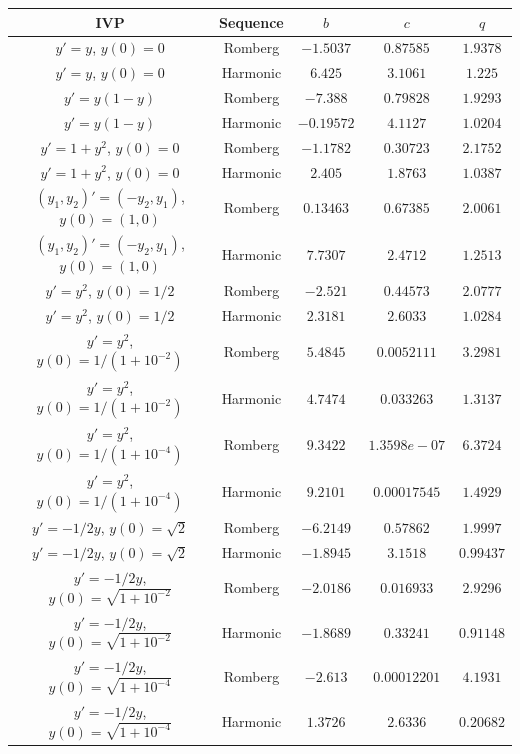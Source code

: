 \begin{table}[H]
    \centering
    \begin{tabular}{c|c||c|c|c}
           IVP & Sequence & \(b\) & \(c\) & \(q\) \\\hline\hline
$y'=y$, $y(0) = 0$ & Romberg & \(-1.5037\) & \(0.87585\) & \(1.9378\)\\
$y'=y$, $y(0) = 0$ & Harmonic & \(6.425\) & \(3.1061\) & \(1.225\)\\
$y' = y(1-y)$ & Romberg & \(-7.388\) & \(0.79828\) & \(1.9293\)\\
$y' = y(1-y)$ & Harmonic & \(-0.19572\) & \(4.1127\) & \(1.0204\)\\
$y' = 1 + y^2$, $y(0) = 0$ & Romberg & \(-1.1782\) & \(0.30723\) & \(2.1752\) \\
$y' = 1 + y^2$, $y(0) = 0$ & Harmonic & \(2.405\) & \(1.8763\) & \(1.0387\)\\
$(y_1,y_2)' = (-y_2,y_1)$, $y(0) = (1,0)$ & Romberg & \(0.13463\) & \(0.67385\) & \(2.0061\) \\
$(y_1,y_2)' = (-y_2,y_1)$, $y(0) = (1,0)$ & Harmonic & \(7.7307\) & \(2.4712\) & \(1.2513\)\\
$y' = y^2$, $y(0) = 1/2$ & Romberg & \(-2.521\) & \(0.44573\) & \(2.0777\) \\
$y' = y^2$, $y(0) = 1/2$ & Harmonic & \(2.3181\) & \(2.6033\) & \(1.0284\)\\
$y'=y^2$, $y(0) = 1/(1+10^{-2})$ & Romberg & \(5.4845\) & \(0.0052111\) & \(3.2981\) \\
$y'=y^2$, $y(0) = 1/(1+10^{-2})$ & Harmonic & \(4.7474\) & \(0.033263\) & \(1.3137\) \\
$y'=y^2$, $y(0) = 1/(1+10^{-4})$ & Romberg & \(9.3422\) & \(1.3598e-07\) & \(6.3724\)\\
$y'=y^2$, $y(0) = 1/(1+10^{-4})$ & Harmonic & \(9.2101\) & \(0.00017545\) & \(1.4929\)\\
$y' = -1/2y$, $y(0) = \sqrt{2}$ & Romberg & \(-6.2149\) & \(0.57862\) & \(1.9997\)\\
$y' = -1/2y$, $y(0) = \sqrt{2}$ & Harmonic & \(-1.8945\) & \(3.1518\) & \(0.99437\)\\
$y' = -1/2y$, $y(0) = \sqrt{1+10^{-2}}$ & Romberg & \(-2.0186\) & \(0.016933\) & \(2.9296\)\\
$y' = -1/2y$, $y(0) = \sqrt{1+10^{-2}}$ & Harmonic & \(-1.8689\) & \(0.33241\) & \(0.91148\) \\
$y' = -1/2y$, $y(0) = \sqrt{1+10^{-4}}$ & Romberg & \(-2.613\) & \(0.00012201\) & \(4.1931\)\\
$y' = -1/2y$, $y(0) = \sqrt{1+10^{-4}}$ & Harmonic & \(1.3726\) & \(2.6336\) & \(0.20682\)\\

\end{tabular}
\end{table}
